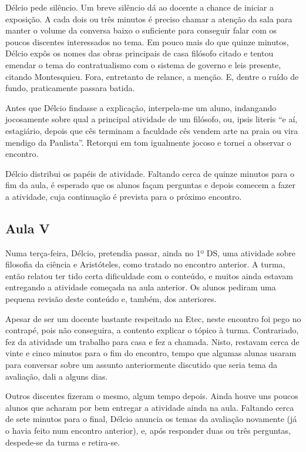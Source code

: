 \documentclass[12pt,a4paper]{article}
\begin{document}
	Délcio pede silêncio. Um breve silêncio dá ao docente a chance de iniciar 
	a exposição. A cada dois ou três minutos é preciso chamar a atenção da 
	sala para manter o volume da conversa baixo o suficiente para conseguir 
	falar com os poucos discentes interessados no tema. Em pouco mais do que 
	quinze minutos, Délcio expôs os nomes das obras principais de casa 
	filósofo citado e tentou emendar o tema do contratualismo com o sistema 
	de governo e leis presente, citando Montesquieu. Fora, entretanto de 
	relance, a menção. E, dentre o ruído de fundo, praticamente 
	passara batida. 
	
	Antes que Délcio findasse a explicação, interpela-me um aluno, indangando 
	jocosamente sobre qual a principal atividade de um filósofo, ou, ipsis 
	literis ``e aí, estagiário, depois que cês terminam a faculdade cês vendem 
	arte na praia ou vira mendigo da Paulista''. Retorqui em tom igualmente 
	jocoso e tornei a observar o encontro. 
	
	Délcio distribui os papéis de atividade. Faltando cerca de quinze minutos 
	para o fim da aula, é esperado que os alunos façam perguntas e depois 
	comecem a fazer a atividade, cuja continuação é prevista para o próximo 
	encontro. 
	
	\subsection*{Aula V}
	
	Numa terça-feira, Délcio, pretendia passar, ainda no 1º DS, uma atividade 
	sobre filosofia da ciência e Aristóteles, como tratado no encontro 
	anterior. A turma, então relatou ter tido certa dificuldade com o conteúdo, 
	e muitos ainda estavam entregando a atividade começada na aula anterior. 
	Os alunos pediram uma pequena revisão deste conteúdo e, também, dos 
	anteriores.  
	
	Apesar de ser um docente bastante respeitado na Etec, neste encontro foi 
	pego no contrapé, pois não conseguira, a contento explicar o tópico à 
	turma. Contrariado, fez da atividade um trabalho para casa e fez a chamada. 
	Nisto, restavam cerca de vinte e cinco minutos para o fim do encontro, 
	tempo que algumas alunas usaram para conversar sobre um assunto 
	anteriormente discutido que seria tema da avaliação, dali a alguns dias. 
	
	Outros discentes fizeram o mesmo, algum tempo depois. Ainda houve uns 
	poucos alunos que acharam por bem entregar a atividade ainda na aula. 
	Faltando cerca de sete minutos para o final, Délcio anuncia os temas 
	da avaliação novamente (já o havia feito num encontro anterior), e, 
	após responder duas ou três perguntas, despede-se da turma e retira-se. 
\end{document}
